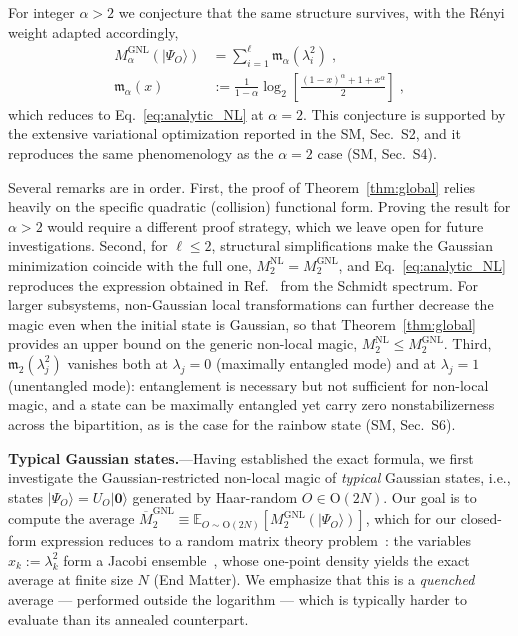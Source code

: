 \documentclass[aps,prl,twocolumn,superscriptaddress,reprint,longbibliography,nofootinbib]{revtex4-2}
\newcommand{\RENYI}{\alpha}
\begin{document}
For integer $\RENYI>2$ we conjecture that the same structure survives, with the R\'enyi weight adapted accordingly,
\begin{equation}
\begin{split}
      M_{\RENYI}^{\mathrm{GNL}}(|\Psi_O\rangle)\! &= \sum_{i=1}^{\ell}\mathfrak{m}_\RENYI(\lambda_i^2)\;,\\
      \mathfrak{m}_\RENYI(x)&:=
    \frac{1}{1-\RENYI}\log_2\! \left[\frac{\left(1-x \right)^{\RENYI }\!\!+1+ x^{ \RENYI }}{2} \right]\;,
\end{split}
    \label{eq:analytic_NL_alpha}
\end{equation}
which reduces to Eq.~\eqref{eq:analytic_NL} at $\RENYI=2$. This conjecture is supported by the extensive variational optimization reported in the SM, Sec.~S2, and it reproduces the same phenomenology as the $\RENYI=2$ case (SM, Sec.~S4).

Several remarks are in order.
First, the proof of Theorem~\ref{thm:global} relies heavily on the specific quadratic (collision) functional form. Proving the result for $\RENYI>2$ would require a different proof strategy, which we leave open for future investigations.
Second, for $\ell\le 2$, structural simplifications make the Gaussian minimization coincide with the full one, $M_2^{\mathrm{NL}}=M_2^{\mathrm{GNL}}$, and Eq.~\eqref{eq:analytic_NL} reproduces the expression obtained in Ref.~\cite{Cao_2025} from the Schmidt spectrum. For larger subsystems, non-Gaussian local transformations can further decrease the magic even when the initial state is Gaussian, so that Theorem~\ref{thm:global} provides an upper bound on the generic non-local magic, $M_2^{\mathrm{NL}}\le M_2^{\mathrm{GNL}}$.
Third, $\mathfrak{m}_2(\lambda_j^2)$ vanishes both at $\lambda_j = 0$  (maximally entangled mode) and at $\lambda_j = 1$  (unentangled mode): entanglement is necessary but not sufficient for non-local magic, and a state can be maximally entangled yet carry zero nonstabilizerness across the bipartition, as is the case for the rainbow state (SM, Sec.~S6).

\textbf{Typical Gaussian states.}---Having established the exact formula, we first investigate the Gaussian-restricted non-local magic of \emph{typical} Gaussian states, i.e., states $|\Psi_O\rangle=U_O|\mathbf{0}\rangle$ generated by Haar-random $O\in \mathrm{O}(2N)$.
Our goal is to compute the average $\overline{M}_2^\mathrm{GNL}\equiv \mathbb{E}_{O\sim \mathrm{O}(2N)}[M_2^\mathrm{GNL}(|\Psi_O\rangle)]$, which for our closed-form expression reduces to a random matrix theory problem~\cite{Mehta2004,Livan_2018,vidmar2017entanglement}: the variables $x_k:=\lambda_k^2$ form a Jacobi ensemble~\cite{Mehta2004,PhysRevB.103.L241118}, whose one-point density yields the exact average at finite size $N$ (End Matter). We emphasize that this is a \emph{quenched} average --- performed outside the logarithm --- which is typically harder to evaluate than its annealed counterpart.
\end{document}
